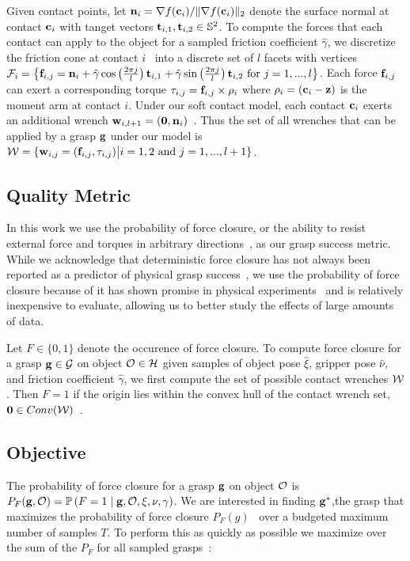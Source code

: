 Given contact points, let $\mathbf{n}_i = \nabla f(\mathbf{c}_i) / \| \nabla f(\mathbf{c}_i) \|_2$ denote the surface normal at contact $\mathbf{c}_i$ with tanget vectors $\mathbf{t}_{i,1}, \mathbf{t}_{i,2} \in \mathbb{S}^2$.
To compute the forces that each contact can apply to the object for a sampled friction coefficient $\hat{\gamma}$, we discretize the friction cone at contact $i$~\cite{pokorny2013classical} into a discrete set of $l$ facets with vertices $\mathcal{F}_{i} = \left\{ \mathbf{f}_{i,j} = \mathbf{n}_i + \hat{\gamma} \cos \left( \frac{2 \pi j}{l} \right) \mathbf{t}_{i,1} + \hat{\gamma} \sin \left( \frac{2 \pi j}{l} \right) \mathbf{t}_{i,2} \text{ for } j = 1, ..., l \right\}$.
Each force $\mathbf{f}_{i,j}$ can exert a corresponding torque $\tau_{i,j} = \mathbf{f}_{i,j} \times \rho_i$ where $\rho_i = (\mathbf{c}_i - \mathbf{z})$ is the moment arm at contact $i$.
Under our soft contact model, each contact $\mathbf{c}_i$ exerts an additional wrench $\mathbf{w}_{i,l+1} = (\mathbf{0}, \mathbf{n}_i)$~\cite{zheng2005}.
Thus the set of all wrenches that can be applied by a grasp $\mathbf{g}$ under our model is $\mathcal{W} = \{ \mathbf{w}_{i,j} = (\mathbf{f}_{i,j}, \tau_{i,j}) \big| i = 1, 2 \text{ and } j = 1, ..., l+1\}$.

\subsection{Quality Metric}
In this work we use the probability of force closure, or the ability to resist external force and torques in arbitrary directions~\cite{ferrari1992}, as our grasp success metric.
While we acknowledge that deterministic force closure has not always been reported as a predictor of physical grasp success~\cite{balasubramanian2012physical, diankov2010automated}, we use the probability of force closure because of it has shown promise in physical experiments~\cite{kim2012physically, weisz2012pose} and is relatively inexpensive to evaluate, allowing us to better study the effects of large amounts of data.

Let $F \in \{0, 1\}$ denote the occurence of force closure.
To compute force closure for a grasp $\mathbf{g} \in \mathcal{G}$ on object $\mathcal{O} \in \mathcal{H}$ given samples of object pose $\hat{\xi}$, gripper pose $\hat{\nu}$, and friction coefficient $\hat{\gamma}$, we first compute the set of possible contact wrenches $\mathcal{W}$.
Then $F = 1$ if the origin lies within the convex hull of the contact wrench set, $\mathbf{0} \in Conv(\mathcal{W})$~\cite{weisz2012pose}.

\subsection{Objective}
The probability of force closure for a grasp $\mathbf{g}$ on object $\mathcal{O}$ is $P_F(\mathbf{g}, \mathcal{O}) = \mathbb{P}\left(F = 1 \mid \mathbf{g}, \mathcal{O}, \xi, \nu, \gamma \right)$.
We are interested in finding $\mathbf{g}^*$,the grasp that maximizes the probability of force closure $P_F(g)$~\cite{kim2012physically, laskey2015bandits, mahler2015gp, weisz2012pose} over a budgeted maximum number of samples $T$.
To perform this as quickly as possible we maximize over the sum of the $P_F$ for all sampled grasps~\cite{laskey2015bandits, srinivas10gaussian}:

